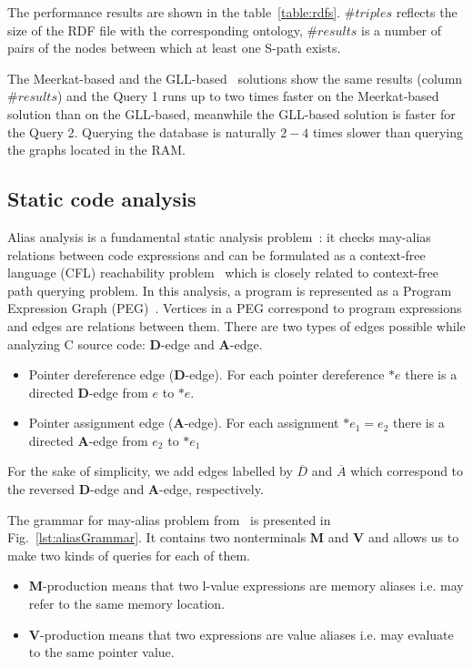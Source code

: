 The performance results are shown in the table~\ref{table:rdfs}. $\#triples$ reflects the size of the RDF file with the corresponding ontology, $\#results$ is a number of pairs of the nodes between which at least one S-path exists. 

The Meerkat-based and the GLL-based~\cite{GrigorevR16} solutions show the same results (column $\#results$) and the Query 1 runs up to two times faster on the Meerkat-based solution than on the GLL-based, meanwhile the GLL-based solution is faster for the Query 2. Querying the database is naturally $2-4$ times slower than querying the graphs located in the RAM.


\subsection{Static code analysis}

Alias analysis is a fundamental static analysis problem~\cite{Marlowe}: it checks may-alias relations between code expressions and can be formulated as a context-free language (CFL) reachability problem~\cite{Reps} which is closely related to context-free path querying problem.
In this analysis, a program is represented as a Program Expression Graph (PEG)~\cite{Zheng}.
Vertices in a PEG correspond to program expressions and edges are relations between them.
There are two types of edges possible while analyzing C source code: \textbf{D}-edge and \textbf{A}-edge.

\begin{itemize}
    \item Pointer dereference edge (\textbf{D}-edge). For each pointer dereference $*e$ there is a directed \textbf{D}-edge from $e$ to $*e$.
    \item Pointer assignment edge (\textbf{A}-edge). For each assignment $*e_1=e_2$ there is a directed \textbf{A}-edge from $e_2$ to $*e_1$
\end{itemize}

For the sake of simplicity, we add edges labelled by $\overline{D}$ and $\overline{A}$ which correspond to the reversed \textbf{D}-edge and \textbf{A}-edge, respectively.

The grammar for may-alias problem from~\cite{Zheng} is presented in Fig.~\ref{lst:aliasGrammar}.
It contains two nonterminals \textbf{M} and \textbf{V} and allows us to make two kinds of queries for each of them.

\begin{itemize}
    \item \textbf{M}-production means that two l-value expressions are memory aliases i.e. may refer to the same memory location.
    \item \textbf{V}-production means that two expressions are value aliases i.e. may evaluate to the same pointer value.
\end{itemize}

